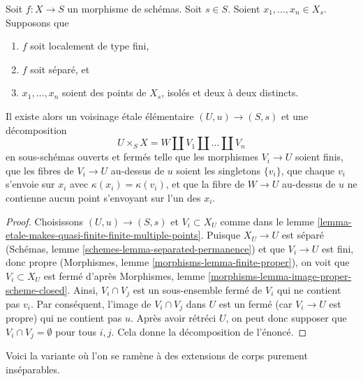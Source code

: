 \begin{lemma}
\label{lemma-etale-splits-off-quasi-finite-part-technical}
Soit $f : X \to S$ un morphisme de schémas.
Soit $s \in S$. Soient $x_1, \ldots, x_n \in X_s$. Supposons que
\begin{enumerate}
\item $f$ soit localement de type fini,
\item $f$ soit séparé, et
\item $x_1, \ldots, x_n$ soient des points de $X_s$, isolés et deux à deux distincts.
\end{enumerate}
Il existe alors un voisinage \'etale élémentaire $(U, u) \to (S, s)$
et une décomposition
$$
U \times_S X = W \amalg V_1 \amalg \ldots \amalg V_n
$$
en sous-schémas ouverts et fermés telle que les morphismes
$V_i \to U$ soient finis, que les fibres de $V_i \to U$ au-dessus de $u$ soient
les singletons $\{v_i\}$, que chaque $v_i$ s'envoie sur $x_i$ avec
$\kappa(x_i) = \kappa(v_i)$, et que la fibre de $W \to U$
au-dessus de $u$ ne contienne aucun point s'envoyant sur l'un des $x_i$.
\end{lemma}

\begin{proof}
Choisissons $(U, u) \to (S, s)$ et $V_i \subset X_U$ comme dans le
lemme \ref{lemma-etale-makes-quasi-finite-finite-multiple-points}.
Puisque $X_U \to U$ est séparé
(Schémas, lemme \ref{schemes-lemma-separated-permanence})
et que $V_i \to U$ est fini, donc propre
(Morphismes, lemme \ref{morphisms-lemma-finite-proper}),
on voit que $V_i \subset X_U$ est fermé d'après
Morphismes, lemme \ref{morphisms-lemma-image-proper-scheme-closed}.
Ainsi, $V_i \cap V_j$ est un sous-ensemble fermé de $V_i$ qui
ne contient pas $v_i$. Par conséquent, l'image de $V_i \cap V_j$
dans $U$ est un fermé (car $V_i \to U$ est propre) qui ne
contient pas $u$. Après avoir rétréci $U$, on peut donc supposer
que $V_i \cap V_j = \emptyset$ pour tous $i, j$. Cela donne la
décomposition de l'énoncé.
\end{proof}

\noindent
Voici la variante où l'on se ramène à des extensions de corps
purement inséparables.

